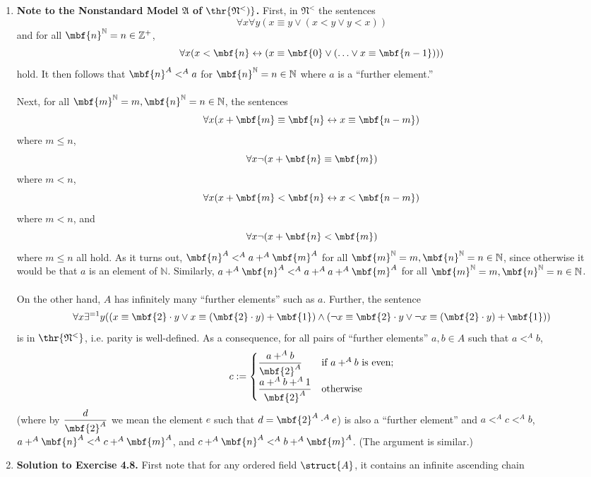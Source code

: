 \begin{enumerate}[1.]
%
\item \label{VI_4_1} \textbf{Note to the Nonstandard Model $\mathfrak{A}$ of $\thr{\mathfrak{N}^<)}$.} First, in $\mathfrak{N}^<$ the sentences
\[
\forall x \forall y ( x \equiv y \lor ( x < y \lor y < x ) )
\]
and for all $\mbf{n}^{\mathbb{N}} = n \in \mathbb{Z}^+$,
\[
\forall x ( x < \mbf{n} \leftrightarrow ( x \equiv \mbf{0} \lor ( \ldots \lor x \equiv \mbf{n-1}) ) )
\]
hold. It then follows that $\mbf{n}^A <^A a$ for $\mbf{n}^{\mathbb{N}} = n \in \mathbb{N}$ where $a$ is a ``further element.''\\
\\
Next, for all $\mbf{m}^{\mathbb{N}} = m, \mbf{n}^{\mathbb{N}} = n \in \mathbb{N}$, the sentences
\[
\forall x ( x + \mbf{m} \equiv \mbf{n} \leftrightarrow x \equiv \mbf{n-m})
\]
where $m \leq n$,
\[
\forall x \neg ( x + \mbf{n} \equiv \mbf{m})
\]
where $m < n$,
\[
\forall x ( x + \mbf{m} < \mbf{n} \leftrightarrow x < \mbf{n-m} )
\]
where $m < n$, and
\[
\forall x \neg ( x + \mbf{n} < \mbf{m} )
\]
where $m \leq n$ all hold. As it turns out, $\mbf{n}^A <^A a +^A \mbf{m}^A$ for all $\mbf{m}^{\mathbb{N}} = m, \mbf{n}^{\mathbb{N}} = n \in \mathbb{N}$, since otherwise it would be that $a$ is an element of $\mathbb{N}$. Similarly, $a +^A \mbf{n}^A <^A a +^A a +^A \mbf{m}^A$ for all $\mbf{m}^{\mathbb{N}} = m, \mbf{n}^{\mathbb{N}} = n \in \mathbb{N}$.\\
\\
On the other hand, $A$ has infinitely many ``further elements'' such as $a$. Further, the sentence
\[
\forall x \exists^{=1} y ( ( x \equiv \mbf{2} \cdot y \lor x \equiv ( \mbf{2} \cdot y ) + \mbf{1} ) \land (\neg x \equiv \mbf{2} \cdot y \lor \neg x \equiv ( \mbf{2} \cdot y ) + \mbf{1} ) )
\]
is in $\thr{\mathfrak{N}^<}$, i.e. parity is well-defined. As a consequence, for all pairs of ``further elements'' $a, b \in A$ such that $a <^A b$,
\[
c := \begin{cases}
\displaystyle\frac{a +^A b}{\mbf{2}^A} & \mbox{if \(a +^A b\) is even;} \cr
\displaystyle\frac{a +^A b +^A 1}{\mbf{2}^A} & \mbox{otherwise}
\end{cases}
\]
(where by $\displaystyle\frac{d}{\mbf{2}^A}$ we mean the element $e$ such that $d = \mbf{2}^A \cdot^A e$) is also a ``further element'' and $a <^A c <^A b$, $a +^A \mbf{n}^A <^A c +^A \mbf{m}^A$, and $c +^A \mbf{n}^A <^A b +^A \mbf{m}^A$. (The argument is similar.)
%
\item \textbf{Solution to Exercise 4.8.} First note that for any ordered field $\struct{A}$, it contains an infinite ascending chain\\

\end{enumerate}
